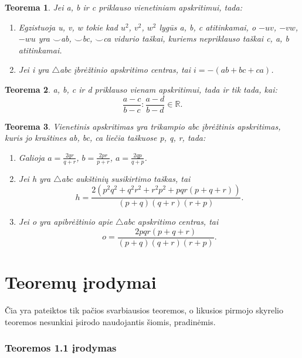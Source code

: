 \documentclass[11pt,a4paper,twoside]{book}
\newtheorem{thmnr}{Teorema}
\theoremstyle{definition} \newtheorem*{api}{Apibrėžimas}
\theoremstyle{remark} \newtheorem*{pastaba}{Pastaba}
\begin{document}
\begin{thmnr} Jei a, b ir c priklauso vienetiniam apskritimui, tada:\
\begin{enumerate}
\item Egzistuoja u, v, w tokie kad $u^2$, $v^2$, $w^2$ lygūs a, b, c atitinkamai, o $-uv$, $-vw$, $-wu$ yra $\smile$ab, $\smile$bc, $\smile$ca vidurio taškai, kuriems nepriklauso taškai c, a, b atitinkamai.
\item Jei i yra $\bigtriangleup$abc įbrėžtinio apskritimo centras, tai $i= - (ab + bc + ca)$.
\end{enumerate}
\end{thmnr}

\begin{thmnr} a, b, c ir d priklauso vienam apskritimui, tada ir tik tada, kai: 
$$\frac{a - c}{b - c}:\frac{a-d}{b-d}\in\mathbb{R}.$$
\end{thmnr}

\begin{thmnr} Vienetinis apskritimas yra trikampio abc įbrėžtinis apskritimas, kuris jo kraštines ab, bc, ca liečia taškuose p, q, r, tada:\
\begin{enumerate}
\item Galioja $a=\frac{2qr}{q + r}$, $b=\frac{2pr}{p + r}$, $a=\frac{2qp}{q + p}$.
\item Jei h yra $\bigtriangleup$abc aukštinių susikirtimo taškas, tai
\begin{equation*}
h=\frac{2(p^2q^2 + q^2r^2 + r^2p^2 + pqr(p + q+ r))}{(p+q)(q+r)(r+p)}.
\end{equation*}
\item Jei o yra apibrėžtinio apie  $\bigtriangleup$abc apskritimo centras, tai
\[o=\frac{2pqr(p+q+r)}{(p+q)(q+r)(r+p)}.\]
\end{enumerate}
\end{thmnr}

\chapter{Teoremų įrodymai}
Čia yra pateiktos tik pačios svarbiausios teoremos, 
o likusios pirmojo skyrelio teoremos nesunkiai įsirodo
naudojantis šiomis, pradinėmis.
  
\subsection*{Teoremos 1.1 įrodymas}
\end{document}
